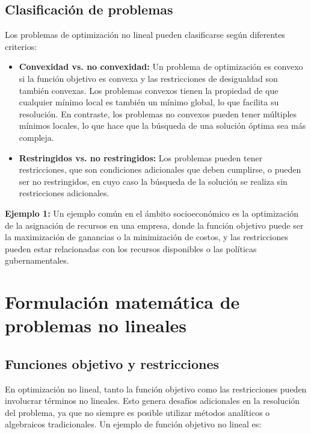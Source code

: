 \subsection{Clasificación de problemas}

\begin{flushleft}
	Los problemas de optimización no lineal pueden clasificarse según diferentes criterios:
\end{flushleft}

\begin{itemize}
	\item \textbf{Convexidad vs. no convexidad:} Un problema de optimización es convexo si la función objetivo es convexa y las restricciones de desigualdad son también convexas. Los problemas convexos tienen la propiedad de que cualquier mínimo local es también un mínimo global, lo que facilita su resolución. En contraste, los problemas no convexos pueden tener múltiples mínimos locales, lo que hace que la búsqueda de una solución óptima sea más compleja.
	\item \textbf{Restringidos vs. no restringidos:} Los problemas pueden tener restricciones, que son condiciones adicionales que deben cumplirse, o pueden ser no restringidos, en cuyo caso la búsqueda de la solución se realiza sin restricciones adicionales.
\end{itemize}

\begin{flushleft}
	\textbf{Ejemplo 1:} Un ejemplo común en el ámbito socioeconómico es la optimización de la asignación de recursos en una empresa, donde la función objetivo puede ser la maximización de ganancias o la minimización de costos, y las restricciones pueden estar relacionadas con los recursos disponibles o las políticas gubernamentales.
\end{flushleft}

\section{Formulación matemática de problemas no lineales}

\subsection{Funciones objetivo y restricciones}

\begin{flushleft}
	En optimización no lineal, tanto la función objetivo como las restricciones pueden involucrar términos no lineales. Esto genera desafíos adicionales en la resolución del problema, ya que no siempre es posible utilizar métodos analíticos o algebraicos tradicionales. Un ejemplo de función objetivo no lineal es:
\end{flushleft}

